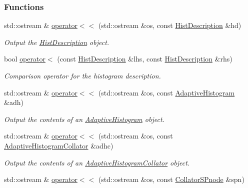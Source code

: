 \subsubsection*{\-Functions}
\begin{DoxyCompactItemize}
\item 
std\-::ostream \& \hyperlink{namespacesubpavings_a7b0c2cba5230c058d175234c14d4f3af}{operator$<$$<$} (std\-::ostream \&os, const \hyperlink{classsubpavings_1_1HistDescription}{\-Hist\-Description} \&hd)
\begin{DoxyCompactList}\small\item\em \-Output the \hyperlink{classsubpavings_1_1HistDescription}{\-Hist\-Description} object. \end{DoxyCompactList}\item 
bool \hyperlink{namespacesubpavings_a91aca11d8ef070d592dcd968dd82d89d}{operator$<$} (const \hyperlink{classsubpavings_1_1HistDescription}{\-Hist\-Description} \&lhs, const \hyperlink{classsubpavings_1_1HistDescription}{\-Hist\-Description} \&rhs)
\begin{DoxyCompactList}\small\item\em \-Comparison operator for the histogram description. \end{DoxyCompactList}\item 
std\-::ostream \& \hyperlink{namespacesubpavings_aa76489a659f3ddc671bcd47d227baad1}{operator$<$$<$} (std\-::ostream \&os, const \hyperlink{classsubpavings_1_1AdaptiveHistogram}{\-Adaptive\-Histogram} \&adh)
\begin{DoxyCompactList}\small\item\em \-Output the contents of an \hyperlink{classsubpavings_1_1AdaptiveHistogram}{\-Adaptive\-Histogram} object. \end{DoxyCompactList}\item 
std\-::ostream \& \hyperlink{namespacesubpavings_a653a8836d9a2c6067d19fe172adda889}{operator$<$$<$} (std\-::ostream \&os, const \hyperlink{classsubpavings_1_1AdaptiveHistogramCollator}{\-Adaptive\-Histogram\-Collator} \&adhc)
\begin{DoxyCompactList}\small\item\em \-Output the contents of an \hyperlink{classsubpavings_1_1AdaptiveHistogramCollator}{\-Adaptive\-Histogram\-Collator} object. \end{DoxyCompactList}\item 
std\-::ostream \& \hyperlink{namespacesubpavings_a4dca88e1718f95fecdf1429d1ebbfd11}{operator$<$$<$} (std\-::ostream \&os, const \hyperlink{classsubpavings_1_1CollatorSPnode}{\-Collator\-S\-Pnode} \&spn)

\end{DoxyCompactItemize}
